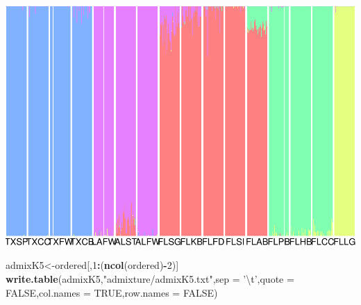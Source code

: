 \documentclass[]{article}
\newenvironment{Shaded}{\begin{snugshade}}{\end{snugshade}}
\newcommand{\KeywordTok}[1]{\textcolor[rgb]{0.13,0.29,0.53}{\textbf{#1}}}
\newcommand{\DataTypeTok}[1]{\textcolor[rgb]{0.13,0.29,0.53}{#1}}
\newcommand{\DecValTok}[1]{\textcolor[rgb]{0.00,0.00,0.81}{#1}}
\newcommand{\CharTok}[1]{\textcolor[rgb]{0.31,0.60,0.02}{#1}}
\newcommand{\StringTok}[1]{\textcolor[rgb]{0.31,0.60,0.02}{#1}}
\newcommand{\OtherTok}[1]{\textcolor[rgb]{0.56,0.35,0.01}{#1}}
\newcommand{\OperatorTok}[1]{\textcolor[rgb]{0.81,0.36,0.00}{\textbf{#1}}}
\newcommand{\NormalTok}[1]{#1}
\begin{document}
\includegraphics{202_fwsw_reanalysis_files/figure-latex/unnamed-chunk-9-1}

\begin{Shaded}
\begin{Highlighting}[]
\NormalTok{admixK5<-ordered[,}\DecValTok{1}\OperatorTok{:}\NormalTok{(}\KeywordTok{ncol}\NormalTok{(ordered)}\OperatorTok{-}\DecValTok{2}\NormalTok{)]}
\KeywordTok{write.table}\NormalTok{(admixK5,}\StringTok{"admixture/admixK5.txt"}\NormalTok{,}\DataTypeTok{sep =} \StringTok{'}\CharTok{\textbackslash{}t}\StringTok{'}\NormalTok{,}\DataTypeTok{quote =} \OtherTok{FALSE}\NormalTok{,}\DataTypeTok{col.names =} \OtherTok{TRUE}\NormalTok{,}\DataTypeTok{row.names =} \OtherTok{FALSE}\NormalTok{)}
\end{Highlighting}
\end{Shaded}
\end{document}
